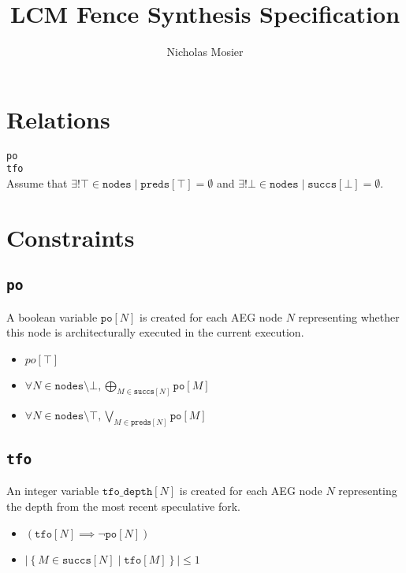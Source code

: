 \documentclass{article}
\title {LCM Fence Synthesis Specification}
\author {Nicholas Mosier}
\theoremstyle{definition}
\newcommand{\po}{\texttt{po}}
\newcommand{\tfo}{\texttt{tfo}}
\newcommand{\tfodepth}{\texttt{tfo\_depth}}
\newcommand{\preds}{\texttt{preds}}
\newcommand{\succs}{\texttt{succs}}
\newcommand{\nodes}{\texttt{nodes}}
\begin{document}
\maketitle
{}

\section{Relations}
\po \\
\tfo \\

Assume that
$\exists! \top \in \nodes \mid \preds [\top] = \emptyset$
and
$\exists! \bot \in \nodes \mid \succs [\bot] = \emptyset$.

\section{Constraints}
\subsection{\po}

A boolean variable $\po [N]$ is created for each AEG node $N$ representing whether this node is architecturally executed in the current execution.

\begin{itemize}
\item $po [\top]$
\item $\forall N \in \nodes \setminus \bot, \bigoplus_{M \in \succs [N]} \po [M]$
\item $\forall N \in \nodes \setminus \top, \bigvee_{M \in \preds [N]} \po [M]$
\end{itemize}

\subsection{\tfo}

An integer variable $\tfodepth [N]$ is created for each AEG node $N$ representing the depth from the most recent speculative fork.

\begin{itemize}
\item $\left( \tfo [N] \implies \neg \po [N] \right)$
\item $\left| \left\{ M \in \succs [N] \mid \tfo [M] \right\} \right| \leq 1$
\end{itemize}
\end{document}
